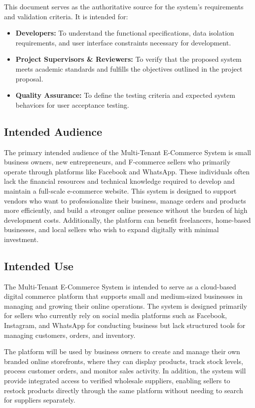 This document serves as the authoritative source for the system's requirements and validation criteria. It is intended for:
\begin{itemize}
    \item \textbf{Developers:} To understand the functional specifications, data isolation requirements, and user interface constraints necessary for development.
    \item \textbf{Project Supervisors \& Reviewers:} To verify that the proposed system meets academic standards and fulfills the objectives outlined in the project proposal.
    \item \textbf{Quality Assurance:} To define the testing criteria and expected system behaviors for user acceptance testing.
\end{itemize}

\subsection{Intended Audience}

The primary intended audience of the Multi-Tenant E-Commerce System is small business owners, new entrepreneurs, and F-commerce sellers who primarily operate through platforms like Facebook and WhatsApp. These individuals often lack the financial resources and technical knowledge required to develop and maintain a full-scale e-commerce website. This system is designed to support vendors who want to professionalize their business, manage orders and products more efficiently, and build a stronger online presence without the burden of high development costs. Additionally, the platform can benefit freelancers, home-based businesses, and local sellers who wish to expand digitally with minimal investment. 

\subsection{Intended Use}

The Multi-Tenant E-Commerce System is intended to serve as a cloud-based digital commerce platform that supports small and medium-sized businesses in managing and growing their online operations. The system is designed primarily for sellers who currently rely on social media platforms such as Facebook, Instagram, and WhatsApp for conducting business but lack structured tools for managing customers, orders, and inventory.

The platform will be used by business owners to create and manage their own branded online storefronts, where they can display products, track stock levels, process customer orders, and monitor sales activity. In addition, the system will provide integrated access to verified wholesale suppliers, enabling sellers to restock products directly through the same platform without needing to search for suppliers separately.

